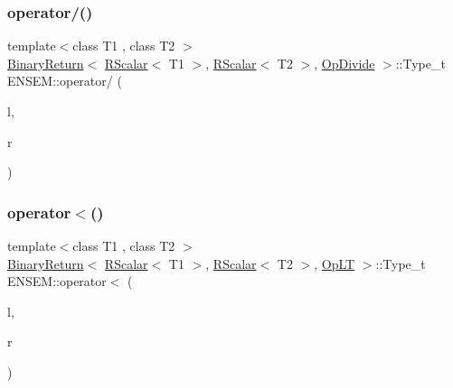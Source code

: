 \subsubsection{\texorpdfstring{operator/()}{operator/()}}
{\footnotesize\ttfamily template$<$class T1 , class T2 $>$ \\
\mbox{\hyperlink{structENSEM_1_1BinaryReturn}{Binary\+Return}}$<$ \mbox{\hyperlink{classENSEM_1_1RScalar}{R\+Scalar}}$<$ T1 $>$, \mbox{\hyperlink{classENSEM_1_1RScalar}{R\+Scalar}}$<$ T2 $>$, \mbox{\hyperlink{structENSEM_1_1OpDivide}{Op\+Divide}} $>$\+::Type\+\_\+t E\+N\+S\+E\+M\+::operator/ (\begin{DoxyParamCaption}\item[{const \mbox{\hyperlink{classENSEM_1_1RScalar}{R\+Scalar}}$<$ T1 $>$ \&}]{l,  }\item[{const \mbox{\hyperlink{classENSEM_1_1RScalar}{R\+Scalar}}$<$ T2 $>$ \&}]{r }\end{DoxyParamCaption})\hspace{0.3cm}{\ttfamily [inline]}}

\mbox{\label{group__rscalar_gaa8cbddeaf30b9bc34c8cca497a259805}} 
\subsubsection{\texorpdfstring{operator$<$()}{operator<()}}
{\footnotesize\ttfamily template$<$class T1 , class T2 $>$ \\
\mbox{\hyperlink{structENSEM_1_1BinaryReturn}{Binary\+Return}}$<$ \mbox{\hyperlink{classENSEM_1_1RScalar}{R\+Scalar}}$<$ T1 $>$, \mbox{\hyperlink{classENSEM_1_1RScalar}{R\+Scalar}}$<$ T2 $>$, \mbox{\hyperlink{structENSEM_1_1OpLT}{Op\+LT}} $>$\+::Type\+\_\+t E\+N\+S\+E\+M\+::operator$<$ (\begin{DoxyParamCaption}\item[{const \mbox{\hyperlink{classENSEM_1_1RScalar}{R\+Scalar}}$<$ T1 $>$ \&}]{l,  }\item[{const \mbox{\hyperlink{classENSEM_1_1RScalar}{R\+Scalar}}$<$ T2 $>$ \&}]{r }\end{DoxyParamCaption})\hspace{0.3cm}{\ttfamily [inline]}}

\mbox{\label{group__rscalar_ga362d60e2c1d2c88b747e44c6102f87db}} 
